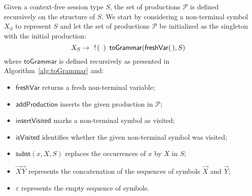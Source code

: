 Given a context-free session type $S$, the set of productions $\mathcal{P}$
is defined recursively on the structure of $S$. We start by considering 
a non-terminal symbol $X_S$ to represent $S$ and let the set of productions 
$\mathcal{P}$ be initialized as the singleton with the initial production: 
\begin{equation}
\label{initial_prod}
	X_S \rightarrow \enspace \,!\, ( \enspace )\enspace \mathsf{toGrammar}(\mathsf{freshVar}(\,),S) 	
\end{equation}
where $\mathsf{toGrammar}$ is defined recursively as presented 
in Algorithm~\ref{alg:toGrammar} and:
\begin{itemize}
	\item $\mathsf{freshVar}$ returns a fresh non-terminal variable;
	\item $\mathsf{addProduction}$ inserts the given production in $\mathcal{P}$;
	\item $\mathsf{insertVisited}$ marks a non-terminal symbol as visited;
	\item $\mathsf{isVisited}$ identifies whether the given non-terminal symbol was visited;
	\item $\mathsf{subst}(x,X,S)$ replaces the occurrences of $x$ by $X$ in $S$;
	\item $\vec X \vec Y$ represents the concatenation of the sequences of symbols $\vec X$ and $\vec Y$;
	\item $\varepsilon$ represents the empty sequence of symbols.
\end{itemize}

